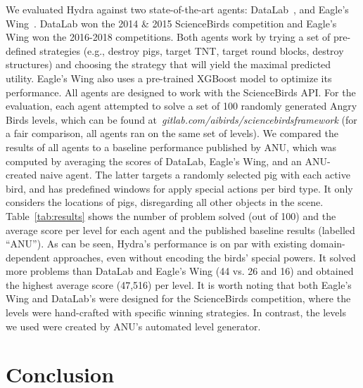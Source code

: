 \documentclass[letterpaper]{article} %
\begin{document}
We evaluated Hydra against two state-of-the-art agents:
DataLab~\cite{borovicka2014datalab}, and
Eagle's Wing~\cite{wang2017description}.
DataLab won the 2014 \& 2015 ScienceBirds competition and Eagle's Wing won the 2016-2018 competitions.
Both agents work by trying a set of pre-defined strategies (e.g., destroy pigs, target TNT, target round blocks, destroy structures) and choosing the strategy that will yield the maximal predicted utility.
Eagle's Wing also uses a pre-trained XGBoost model to optimize its performance. %
All agents are designed to work with the ScienceBirds API. For the evaluation, each agent attempted to solve a set of 100 randomly generated Angry Birds levels, which can be found at~\emph{gitlab.com/aibirds/sciencebirdsframework} (for a fair comparison, all agents ran on the same set of levels).
We compared the results of all agents to a baseline performance published by ANU, which was computed by averaging the scores of
DataLab,
Eagle's Wing,
and an ANU-created naive agent.
The latter targets a randomly selected pig with each active bird, and has predefined windows for apply special actions per bird type. It only considers the locations of pigs, disregarding all other objects in the scene.  Table~\ref{tab:results} shows the number of problem solved (out of 100) and the average score per level for each agent and the published baseline results (labelled ``ANU'').
As can be seen, Hydra's performance is on par with existing domain-dependent approaches, even without encoding the birds' special powers. It solved more problems than DataLab and Eagle's Wing (44 vs. 26 and 16) and obtained the highest average score (47,516) per level.
It is worth noting that both Eagle's Wing and DataLab's were designed for the ScienceBirds competition, where the levels were hand-crafted with specific winning strategies. In contrast, the levels we used were created by ANU's automated level generator.

















\section{Conclusion}
\end{document}
